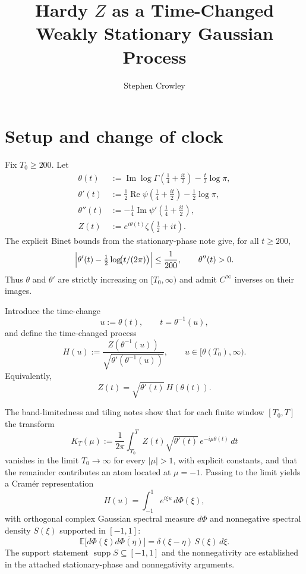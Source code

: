 \documentclass[11pt]{article}
\title{Hardy $Z$ as a Time-Changed Weakly Stationary Gaussian Process}
\author{Stephen Crowley}
\date{}
\DeclareMathOperator{\ImOp}{Im}
\DeclareMathOperator{\ReOp}{Re}
\let\Im\ImOp
\let\Re\ReOp
\begin{document}
\maketitle

\section{Setup and change of clock}

Fix $T_{0}\ge 200$. Let
\begin{align}
\theta(t)
&:= \Im\log\Gamma\!\left(\tfrac14+\tfrac{it}{2}\right)
   -\frac{t}{2}\log\pi,
\label{eq:theta-app}
\\
\theta'(t)
&:= \frac12\Re\psi\!\left(\tfrac14+\tfrac{it}{2}\right)
   -\frac12\log\pi,
\label{eq:theta-prime-app}
\\
\theta''(t)
&:= -\frac14\Im\psi'\!\left(\tfrac14+\tfrac{it}{2}\right),
\label{eq:theta-second-app}
\\
Z(t)
&:= e^{i\theta(t)}\zeta\!\left(\tfrac12+it\right).
\label{eq:Z-def-app}
\end{align}
The explicit Binet bounds from the stationary-phase note give, for all
$t\ge 200$,
\begin{equation}
\Bigl|\theta'(t)-\tfrac12\log\!\bigl(t/(2\pi)\bigr)\Bigr|
\le \frac1{200},
\qquad
\theta''(t)>0.
\label{eq:binet-app}
\end{equation}
Thus $\theta$ and $\theta'$ are strictly increasing on $[T_{0},\infty)$
and admit $C^{\infty}$ inverses on their images. \cite{Edwards,StationaryPhase} 

Introduce the time-change
\[
u := \theta(t),\qquad t=\theta^{-1}(u),
\]
and define the time-changed process
\begin{equation}
H(u)
:=
\frac{Z(\theta^{-1}(u))}{\sqrt{\theta'(\theta^{-1}(u))}},
\qquad
u\in[\theta(T_{0}),\infty).
\label{eq:H-def-app}
\end{equation}
Equivalently,
\begin{equation}
Z(t) = \sqrt{\theta'(t)}\,H(\theta(t)).
\label{eq:Z-from-H-app}
\end{equation}

The band-limitedness and tiling notes show that for each finite window
$[T_{0},T]$ the transform
\[
K_{T}(\mu)
:=
\frac1{2\pi}\int_{T_{0}}^{T}
Z(t)\sqrt{\theta'(t)}\,e^{-i\mu\theta(t)}\,dt
\]
vanishes in the limit $T_{0}\to\infty$ for every $|\mu|>1$, with explicit
constants, and that the remainder contributes an atom located at
$\mu=-1$. Passing to the limit yields a Cram\'er representation
\begin{equation}
H(u)
=
\int_{-1}^{1} e^{i\xi u}\,d\Phi(\xi),
\label{eq:Cramer-app}
\end{equation}
with orthogonal complex Gaussian spectral measure $d\Phi$ and nonnegative
spectral density $S(\xi)$ supported in $[-1,1]$:
\begin{equation}
\mathbb{E}\!\bigl[d\Phi(\xi)\overline{d\Phi(\eta)}\bigr]
=
\delta(\xi-\eta)\,S(\xi)\,d\xi.
\label{eq:Phi-orth-app}
\end{equation}
The support statement $\operatorname{supp}S\subseteq[-1,1]$ and the
nonnegativity are established in the attached stationary-phase and
nonnegativity arguments. \cite{StationaryPhase,SpectralNonNegativity}
\end{document}
